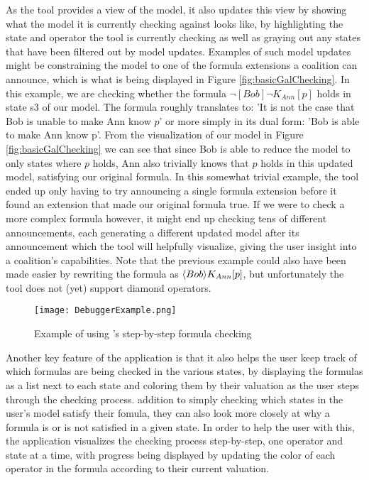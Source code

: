 As the tool provides a view of the model, it also updates this view by showing what the model it is currently checking against looks like, by highlighting the state and operator the tool is currently checking as well as graying out any states that have been filtered out by model updates. Examples of such model updates might be constraining the model to one of the formula extensions a coalition can announce, which is what is being displayed in Figure \ref{fig:basicGalChecking}. In this example, we are checking whether the formula $\neg [Bob]\neg K_{Ann}[p]$ holds in state s3 of our model. The formula roughly translates to: 'It is not the case that Bob is unable to make Ann know $p$' or more simply in its dual form: 'Bob is able to make Ann know p'. From the visualization of our model in Figure \ref{fig:basicGalChecking} we can see that since Bob is able to reduce the model to only states where $p$ holds, Ann also trivially knows that $p$ holds in this updated model, satisfying our original formula. In this somewhat trivial example, the tool ended up only having to try announcing a single formula extension before it found an extension that made our original formula true. If we were to check a more complex formula however, it might end up checking tens of different announcements, each generating a different updated model after its announcement which the tool will helpfully visualize, giving the user insight into a coalition's capabilities. Note that the previous example could also have been made easier by rewriting the formula as $\langle Bob\rangle K_{Ann}[p]$, but unfortunately the tool does not (yet) support diamond operators. 


\begin{figure}[h]
	\label{fig:debugExmpl}
	\caption{Example of using \cname's step-by-step formula checking}
	\texttt{[image: DebuggerExample.png]}
\end{figure}


Another key feature of the application is that it also helps the user keep track of which formulas are being checked in the various states, by displaying the formulas as a list next to each state and coloring them by their valuation as the user steps through the checking process.  addition to simply checking which states in the user's model satisfy their fomula, they can also look more closely at why a formula is or is not satisfied in a given state. In order to help the user with this, the application visualizes the checking process step-by-step, one operator and state at a time, with progress being displayed by updating the color of each operator in the formula according to their current valuation.


